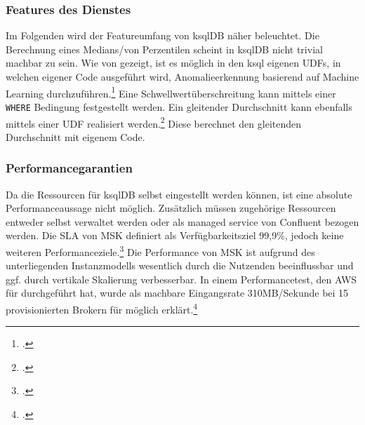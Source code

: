 \subsubsection{Features des Dienstes}
Im Folgenden wird der Featureumfang von ksqlDB näher beleuchtet.
Die Berechnung eines Medians/von Perzentilen scheint in ksqlDB nicht trivial machbar zu sein.
Wie von \citeauthor{Waehner.2018} gezeigt, ist es möglich in den ksql eigenen \acp{UDF}, in welchen eigener Code ausgeführt wird, Anomalieerkennung basierend auf Machine Learning durchzuführen.\footcite[Vgl.][]{Waehner.2018}
Eine Schwellwertüberschreitung kann mittels einer \texttt{WHERE} Bedingung festgestellt werden.
Ein gleitender Durchschnitt kann ebenfalls mittels einer \ac{UDF} realisiert werden.\footcite[Vgl.][]{ConfluentInc..o.J.c} 
Diese berechnet den gleitenden Durchschnitt mit eigenem Code.

\subsubsection{Performancegarantien}
Da die Ressourcen für ksqlDB selbst eingestellt werden können, ist eine absolute Performanceaussage nicht möglich. Zusätzlich müssen zugehörige Ressourcen entweder selbst verwaltet werden oder als managed service von Confluent bezogen werden.
Die \ac{SLA} von \ac{MSK} definiert als Verfügbarkeitsziel 99,9\%, jedoch keine weiteren Performanceziele.\footcite[Vgl.][]{AmazonWebServicesInc..2019e} 
Die Performance von \ac{MSK} ist aufgrund des unterliegenden Instanzmodells wesentlich durch die Nutzenden beeinflussbar und ggf. durch vertikale Skalierung verbesserbar.
In einem Performancetest, den \ac{AWS} für \citeauthor{Statz.2019} durchgeführt hat, wurde als machbare Eingangsrate 310MB/Sekunde bei 15 provisionierten Brokern für möglich erklärt.\footcite[Vgl.][]{Statz.2019} 

